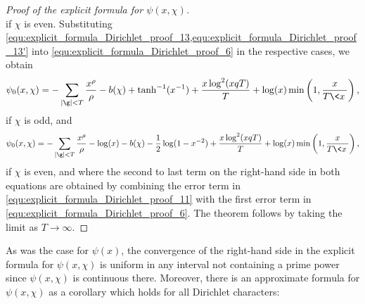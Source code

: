\begin{proof}[Proof of the explicit formula for \(\psi(x,\chi)\)]
\begin{equation}
      \end{equation}
      if \(\chi\) is even.
      Substituting \cref{equ:explicit_formula_Dirichlet_proof_13,equ:explicit_formula_Dirichlet_proof_13'} into \cref{equ:explicit_formula_Dirichlet_proof_6} in the respective cases, we obtain
      \begin{equation}\label{equ:explicit_formula_Dirichlet_proof_14}
        \psi_{0}(x,\chi) = -\sum_{|\g| < T}\frac{x^{\rho}}{\rho}-b(\chi)+\tanh^{-1}(x^{-1})+\frac{x\log^{2}(xqT)}{T}+\log(x)\min\left(1,\frac{x}{T\<x\>}\right),
      \end{equation}
      if \(\chi\) is odd, and
      \begin{equation}\label{equ:explicit_formula_Dirichlet_proof_14'}
        \psi_{0}(x,\chi) = -\sum_{|\g| < T}\frac{x^{\rho}}{\rho}-\log(x)-b(\chi)-\frac{1}{2}\log(1-x^{-2})+\frac{x\log^{2}(xqT)}{T}+\log(x)\min\left(1,\frac{x}{T\<x\>}\right),
      \end{equation}
      if \(\chi\) is even, and where the second to last term on the right-hand side in both equations are obtained by combining the error term in \cref{equ:explicit_formula_Dirichlet_proof_11} with the first error term in \cref{equ:explicit_formula_Dirichlet_proof_6}. The theorem follows by taking the limit as \(T \to \infty\).
    \end{proof}

    As was the case for \(\psi(x)\), the convergence of the right-hand side in the explicit formula for \(\psi(x,\chi)\) is uniform in any interval not containing a prime power since \(\psi(x,\chi)\) is continuous there. Moreover, there is an approximate formula for \(\psi(x,\chi)\) as a corollary which holds for all Dirichlet characters:


